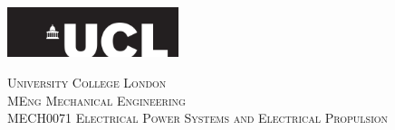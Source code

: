\begin{titlepage}

  \newcommand{\HRule}{\rule{\linewidth}{0.5mm}} %

  \center
  \includegraphics[width=5cm]{Title/UCL.png}\\[1cm] %


  \center %


  \textsc{\LARGE University College London }\\[1.5cm] %
  \textsc{\Large MEng Mechanical Engineering  }\\[0.5cm] %
  \textsc{\large MECH0071 Electrical Power Systems and Electrical Propulsion }\\[1.5cm] %

  \makeatletter
  { \huge \textsc \@title}\\[1.5cm] %




\end{titlepage}
